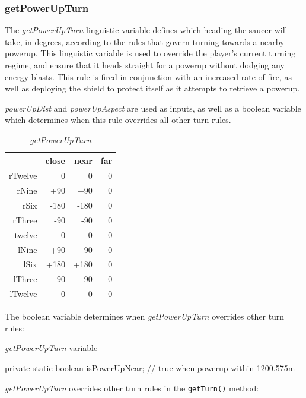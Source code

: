 \subsubsection{getPowerUpTurn}

The \emph{getPowerUpTurn} linguistic variable defines which heading the saucer will take, in degrees, according to the rules that govern turning towards a nearby powerup. This linguistic variable is used to override the player's current turning regime, and ensure that it heads straight for a powerup without dodging any energy blasts. This rule is fired in conjunction with an increased rate of fire, as well as deploying the shield to protect itself as it attempts to retrieve a powerup.

\emph{powerUpDist} and \emph{powerUpAspect} are used as inputs, as well as a boolean variable which determines when this rule overrides all other turn rules.

\begin{table}[H]
\centering
\caption{\emph{getPowerUpTurn}}
\label{Turn rule table}
\begin{tabular}{r|r|r|r}
 		& close 	& near	 	& far 		\\ \hline
rTwelve	& 0			& 0			& 0			\\
rNine	& +90		& +90		& 0			\\
rSix	& -180		& -180		& 0		 	\\
rThree	& -90		& -90		& 0	 		\\
twelve 	& 0			& 0 		& 0 		\\
lNine 	& +90		& +90 		& 0			\\
lSix	& +180		& +180 		& 0 		\\
lThree 	& -90		& -90 		& 0			\\
lTwelve	& 0			& 0 		& 0	 	
\end{tabular}
\end{table}

\noindent
The boolean variable determines when \emph{getPowerUpTurn} overrides other turn rules:

\begin{listing}[H]
\caption{\emph{getPowerUpTurn} variable}
\begin{javacode}
private static boolean isPowerUpNear; // true when powerup within 1200.575m
\end{javacode}
\end{listing}

\noindent
\emph{getPowerUpTurn} overrides other turn rules in the \texttt{getTurn()} method:

